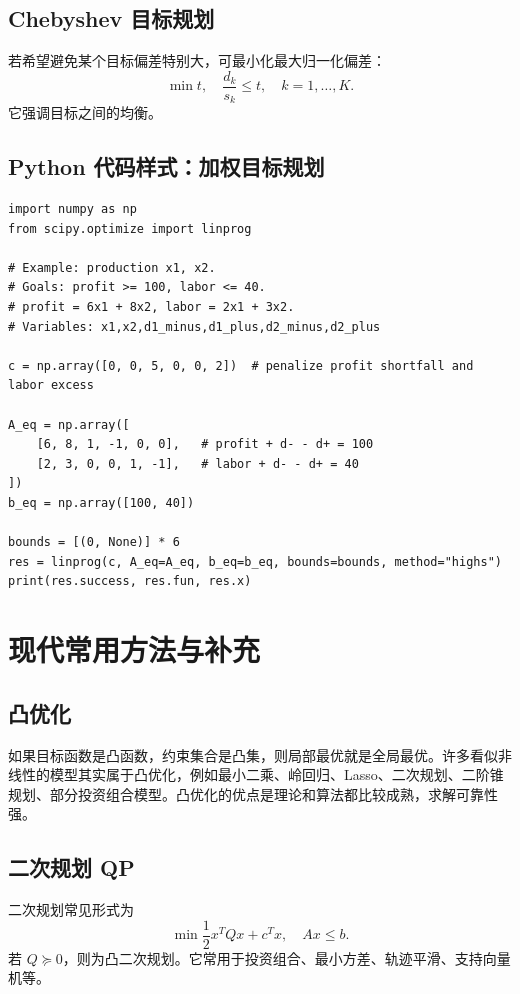 \documentclass[11pt,a4paper]{ctexart}
\begin{document}
\subsection{Chebyshev 目标规划}
若希望避免某个目标偏差特别大，可最小化最大归一化偏差：
\begin{equation}
\min t,\quad \frac{d_k}{s_k}\le t,\quad k=1,\ldots,K.
\end{equation}
它强调目标之间的均衡。

\subsection{Python 代码样式：加权目标规划}
\begin{lstlisting}
import numpy as np
from scipy.optimize import linprog

# Example: production x1, x2.
# Goals: profit >= 100, labor <= 40.
# profit = 6x1 + 8x2, labor = 2x1 + 3x2.
# Variables: x1,x2,d1_minus,d1_plus,d2_minus,d2_plus

c = np.array([0, 0, 5, 0, 0, 2])  # penalize profit shortfall and labor excess

A_eq = np.array([
    [6, 8, 1, -1, 0, 0],   # profit + d- - d+ = 100
    [2, 3, 0, 0, 1, -1],   # labor + d- - d+ = 40
])
b_eq = np.array([100, 40])

bounds = [(0, None)] * 6
res = linprog(c, A_eq=A_eq, b_eq=b_eq, bounds=bounds, method="highs")
print(res.success, res.fun, res.x)
\end{lstlisting}

\section{现代常用方法与补充}

\subsection{凸优化}
如果目标函数是凸函数，约束集合是凸集，则局部最优就是全局最优。许多看似非线性的模型其实属于凸优化，例如最小二乘、岭回归、Lasso、二次规划、二阶锥规划、部分投资组合模型。凸优化的优点是理论和算法都比较成熟，求解可靠性强。

\subsection{二次规划 QP}
二次规划常见形式为
\[
\min \frac12x^TQx+c^Tx,
\quad Ax\le b.
\]
若 $Q\succeq0$，则为凸二次规划。它常用于投资组合、最小方差、轨迹平滑、支持向量机等。
\end{document}
